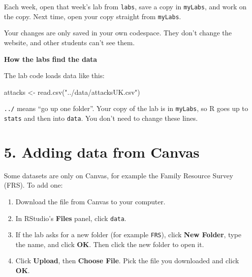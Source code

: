 \documentclass[
  letterpaper,
  DIV=11,
  numbers=noendperiod]{scrreprt}
\newenvironment{Shaded}{\begin{snugshade}}{\end{snugshade}}
\newcommand{\FunctionTok}[1]{\textcolor[rgb]{0.28,0.35,0.67}{#1}}
\newcommand{\NormalTok}[1]{\textcolor[rgb]{0.00,0.23,0.31}{#1}}
\newcommand{\OtherTok}[1]{\textcolor[rgb]{0.00,0.23,0.31}{#1}}
\newcommand{\StringTok}[1]{\textcolor[rgb]{0.13,0.47,0.30}{#1}}
\providecommand{\tightlist}{%
  \setlength{\itemsep}{0pt}\setlength{\parskip}{0pt}}
\begin{document}
Each week, open that week's lab from \texttt{labs}, save a copy in
\texttt{myLabs}, and work on the copy. Next time, open your copy
straight from \texttt{myLabs}.

Your changes are only saved in your own codespace. They don't change the
website, and other students can't see them.

\begin{tcolorbox}[enhanced jigsaw, arc=.35mm, bottomrule=.15mm, bottomtitle=1mm, breakable, colback=white, colbacktitle=quarto-callout-note-color!10!white, colframe=quarto-callout-note-color-frame, coltitle=black, left=2mm, leftrule=.75mm, opacityback=0, opacitybacktitle=0.6, rightrule=.15mm, title=\textcolor{quarto-callout-note-color}{\faInfo}\hspace{0.5em}{Note}, titlerule=0mm, toprule=.15mm, toptitle=1mm]

\textbf{How the labs find the data}

The lab code loads data like this:

\begin{Shaded}
\begin{Highlighting}[]
\NormalTok{attacks }\OtherTok{\textless{}{-}} \FunctionTok{read.csv}\NormalTok{(}\StringTok{"../data/attacksUK.csv"}\NormalTok{)}
\end{Highlighting}
\end{Shaded}

\texttt{../} means ``go up one folder''. Your copy of the lab is in
\texttt{myLabs}, so R goes up to \texttt{stats} and then into
\texttt{data}. You don't need to change these lines.

\end{tcolorbox}

\section*{5. Adding data from Canvas}\label{adding-data-from-canvas}


Some datasets are only on Canvas, for example the Family Resource Survey
(FRS). To add one:

\begin{enumerate}
\def\labelenumi{\arabic{enumi}.}
\tightlist
\item
  Download the file from Canvas to your computer.
\item
  In RStudio's \textbf{Files} panel, click \texttt{data}.
\item
  If the lab asks for a new folder (for example \texttt{FRS}), click
  \textbf{New Folder}, type the name, and click \textbf{OK}. Then click
  the new folder to open it.
\item
  Click \textbf{Upload}, then \textbf{Choose File}. Pick the file you
  downloaded and click \textbf{OK}.
\end{enumerate}
\end{document}
